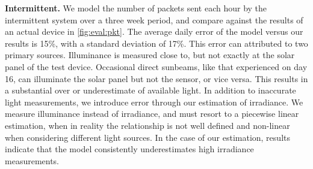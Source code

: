 \vspace{-6pt}
\noindent
\textbf{Intermittent.}
We model the number of packets sent each hour by the
intermittent system over a three week period, and compare against the results of an actual device in
\cref{fig:eval:pkt}.
The average daily error of the model versus our results is 15\%, with a standard deviation of
17\%. This error can attributed to two primary sources. Illuminance is measured
close to, but not exactly at the solar panel of the test device. Occasional
direct sunbeams, like that experienced on day 16, can illuminate the solar
panel but not the sensor, or vice versa. This
results in a substantial over or underestimate of available light. In addition
to inaccurate light measurements, we introduce error through our estimation of
irradiance. We measure illuminance
instead of irradiance, and must resort to a piecewise linear estimation, when
in reality the relationship is not well defined and non-linear when considering
different light sources. In the case of our estimation, results
indicate that the model consistently underestimates high irradiance measurements.\\

